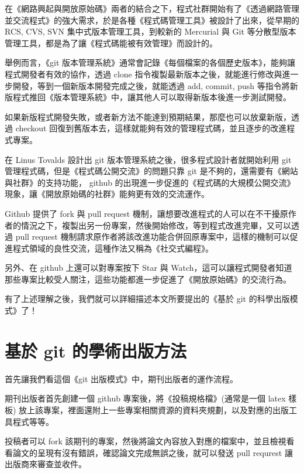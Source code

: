 \documentclass{article}
\begin{document}
在《網路興起與開放原始碼》兩者的結合之下，程式社群開始有了《透過網路管理並交流程式》的強大需求，於是各種《程式碼管理工具》被設計了出來，從早期的
RCS, CVS, SVN 集中式版本管理工具，到較新的 Mercurial 與 Git
等分散型版本管理工具，都是為了讓《程式碼能被有效管理》而設計的。

舉例而言，《git
版本管理系統》通常會記錄《每個檔案的各個歷史版本》，能夠讓程式開發者有效的協作，透過
clone
指令複製最新版本之後，就能進行修改與進一步開發，等到一個新版本開發完成之後，就能透過
add, commit, push
等指令將新版程式推回《版本管理系統》中，讓其他人可以取得新版本後進一步測試開發。

如果新版程式開發失敗，或者新方法不能達到預期結果，那麼也可以放棄新版，透過
checkout
回復到舊版本去，這樣就能夠有效的管理程式碼，並且逐步的改進程式專案。

在 Linus Tovalds 設計出 git 版本管理系統之後，很多程式設計者就開始利用
git 管理程式碼，但是《程式碼公開交流》的問題只靠 git
是不夠的，還需要有《網站與社群》的支持功能， github
的出現進一步促進的《程式碼的大規模公開交流》現象，讓《開放原始碼的社群》能夠更有效的交流運作。

Github 提供了 fork 與 pull request
機制，讓想要改進程式的人可以在不干擾原作者的情況之下，複製出另一份專案，然後開始修改，等到程式改進完畢，又可以透過
pull request
機制請求原作者將該改進功能合併回原專案中，這樣的機制可以促進程式領域的良性交流，這種作法又稱為《社交式編程》。

另外、在 github 上還可以對專案按下 Star 與
Watch，這可以讓程式開發者知道那些專案比較受人關注，這些功能都進一步促進了《開放原始碼》的交流行為。

有了上述理解之後，我們就可以詳細描述本文所要提出的《基於 git
的科學出版模式》了！

\hypertarget{ux57faux65bc-git-ux7684ux5b78ux8853ux51faux7248ux65b9ux6cd5}{%
\section{基於 git
的學術出版方法}\label{ux57faux65bc-git-ux7684ux5b78ux8853ux51faux7248ux65b9ux6cd5}}

首先讓我們看這個《git 出版模式》中，期刊出版者的運作流程。

期刊出版者首先創建一個 github 專案後，將《投稿規格檔》(通常是一個 latex
樣板)
放上該專案，裡面還附上一些專案相關資源的資料夾規劃，以及對應的出版工具程式等等。

投稿者可以 fork
該期刊的專案，然後將論文內容放入對應的檔案中，並且檢視看看論文的呈現有沒有錯誤，確認論文完成無誤之後，就可以發送
pull requrest 讓出版商來審查並收件。
\end{document}

